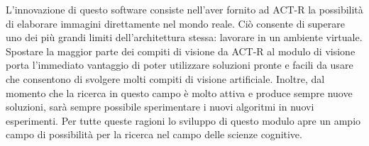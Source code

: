 		L'innovazione di questo software consiste nell'aver fornito ad \mbox{ACT-R} la possibilità di elaborare immagini direttamente nel mondo reale.
		Ciò consente di superare uno dei più grandi limiti dell'architettura stessa: lavorare in un ambiente virtuale.
		Spostare la maggior parte dei compiti di visione da \mbox{ACT-R} al modulo di visione porta l'immediato vantaggio di poter utilizzare soluzioni pronte e facili da usare che consentono di svolgere molti compiti di visione artificiale.
		Inoltre, dal momento che la ricerca in questo campo è molto attiva e produce sempre nuove soluzioni, sarà sempre possibile sperimentare i nuovi algoritmi in nuovi esperimenti.
		Per tutte queste ragioni lo sviluppo di questo modulo apre un ampio campo di possibilità per la ricerca nel campo delle scienze cognitive.
	

 
		





